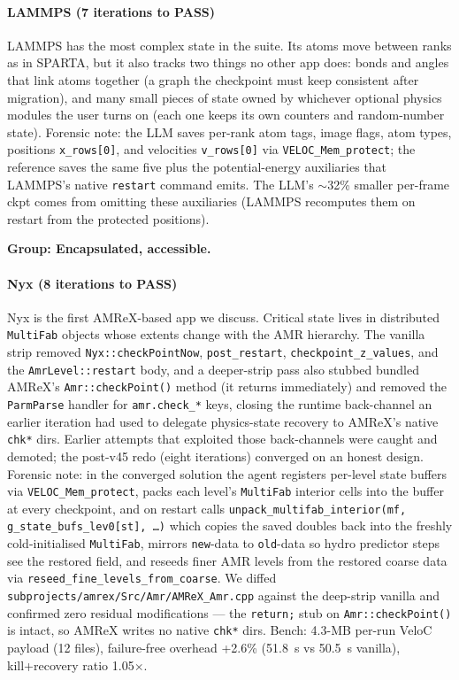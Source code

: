 \documentclass[conference]{IEEEtran}
\begin{document}
\paragraph{LAMMPS (7 iterations to PASS)}
LAMMPS has the most complex state in the suite. Its atoms move between ranks as in SPARTA, but it also tracks two things no other app does: bonds and angles that link atoms together (a graph the checkpoint must keep consistent after migration), and many small pieces of state owned by whichever optional physics modules the user turns on (each one keeps its own counters and random-number state). Forensic note: the LLM saves per-rank atom tags, image flags, atom types, positions \texttt{x\_rows[0]}, and velocities \texttt{v\_rows[0]} via \texttt{VELOC\_Mem\_protect}; the reference saves the same five plus the potential-energy auxiliaries that LAMMPS's native \texttt{restart} command emits. The LLM's $\sim$32\% smaller per-frame ckpt comes from omitting these auxiliaries (LAMMPS recomputes them on restart from the protected positions).

\smallskip\noindent\textbf{Group: Encapsulated, accessible.}

\paragraph{Nyx (8 iterations to PASS)}
Nyx is the first AMReX-based app we discuss. Critical state lives in distributed \texttt{MultiFab} objects whose extents change with the AMR hierarchy. The vanilla strip removed \texttt{Nyx::checkPointNow}, \texttt{post\_restart}, \texttt{checkpoint\_z\_values}, and the \texttt{AmrLevel::restart} body, and a deeper-strip pass also stubbed bundled AMReX's \texttt{Amr::checkPoint()} method (it returns immediately) and removed the \texttt{ParmParse} handler for \texttt{amr.check\_*} keys, closing the runtime back-channel an earlier iteration had used to delegate physics-state recovery to AMReX's native \texttt{chk*} dirs. Earlier attempts that exploited those back-channels were caught and demoted; the post-v45 redo (eight iterations) converged on an honest design. Forensic note: in the converged solution the agent registers per-level state buffers via \texttt{VELOC\_Mem\_protect}, packs each level's \texttt{MultiFab} interior cells into the buffer at every checkpoint, and on restart calls \texttt{unpack\_multifab\_interior(mf, g\_state\_bufs\_lev0[st], \ldots)} which copies the saved doubles back into the freshly cold-initialised \texttt{MultiFab}, mirrors \texttt{new}-data to \texttt{old}-data so hydro predictor steps see the restored field, and reseeds finer AMR levels from the restored coarse data via \texttt{reseed\_fine\_levels\_from\_coarse}. We diffed \texttt{subprojects/amrex/Src/Amr/AMReX\_Amr.cpp} against the deep-strip vanilla and confirmed zero residual modifications --- the \texttt{return;} stub on \texttt{Amr::checkPoint()} is intact, so AMReX writes no native \texttt{chk*} dirs. Bench: 4.3-MB per-run VeloC payload (12 files), failure-free overhead +2.6\% (51.8~s vs 50.5~s vanilla), kill+recovery ratio 1.05$\times$.
\end{document}
